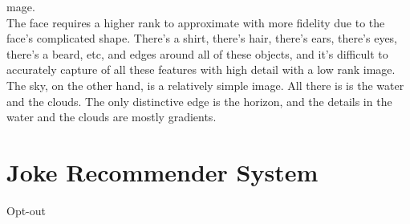\documentclass{article}
\begin{document}
\begin{enumerate}[label=\alph*)]
mage.\\

The face requires a higher rank to approximate with more fidelity due to the face's complicated shape. There's a shirt, there's hair, there's ears, there's eyes, there's a beard, etc, and edges around all of these objects, and it's difficult to accurately capture of all these features with high detail with a low rank image. The sky, on the other hand, is a relatively simple image. All there is is the water and the clouds. The only distinctive edge is the horizon, and the details in the water and the clouds are mostly gradients.
\end{enumerate}

\newpage
\section*{Joke Recommender System}
Opt-out

\newpage
\end{document}
